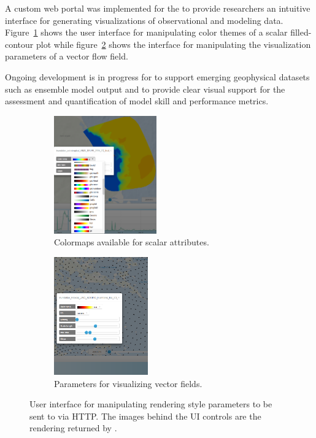 A custom web portal was implemented for the \comt{} \ioos{} to provide
researchers an intuitive interface for generating visualizations of
observational and modeling data. Figure~\ref{fig:ui_colormaps_scalar}
shows the user interface for manipulating color themes of a scalar
filled-contour plot while figure~\ref{fig:ui_vector} shows the
interface for manipulating the visualization parameters of a vector
flow field.

Ongoing development is in progress for \sciwms{} to support emerging
geophysical datasets such as ensemble model output and to provide
clear visual support for the assessment and quantification of model
skill and performance metrics.
\begin{figure}[ht!]
  \centering
  \begin{subfigure}[t]{0.45\textwidth}
    \centering
    \includegraphics[height=2in]{../figs/inundation_extratropical_VIMS_SELFE_2005_final_run_waves_UI_scalar}
    \caption{Colormaps available for scalar attributes.}
    \label{fig:ui_colormaps_scalar}
  \end{subfigure}
  \begin{subfigure}[t]{0.45\textwidth}
    \centering
    \includegraphics[height=2in]{../figs/ui_vectors_crop_inundation_tropical_UND_ADCIRC_Hurricane_Ike_3d_final_run_with_waves}
    \caption{Parameters for visualizing vector fields.}
  \label{fig:ui_vector}
  \end{subfigure}
  \caption{User interface for manipulating rendering style parameters
    to be sent to \sciwms{} via HTTP. The images behind the UI
    controls are the rendering returned by \sciwms{}.}
  \label{fig:ui}
\end{figure}

